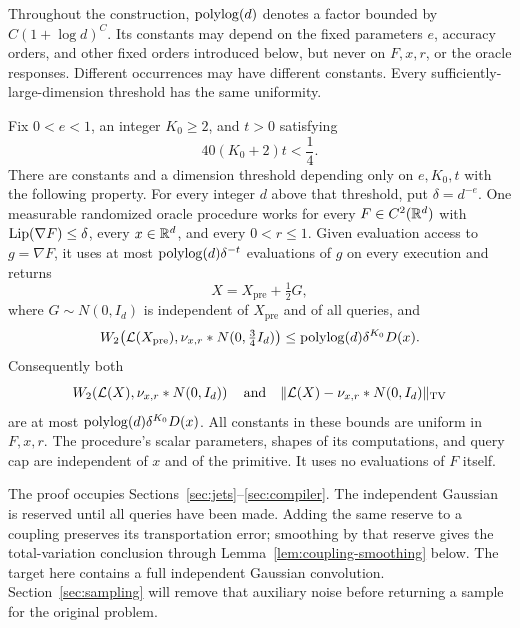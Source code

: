 Throughout the construction, \(\operatorname{polylog}(d)\) denotes a factor
bounded by \(C(1+\log d)^C\). Its constants may depend on the
fixed parameters \(e\), accuracy orders, and other fixed orders
introduced below, but never on \(F,x,r\), or the oracle responses.
Different occurrences may have different constants. Every
sufficiently-large-dimension threshold has the same uniformity.

\begin{theorem}\label{thm:primitive}
Fix \(0<e<1\), an integer \(K_0\ge2\), and \(t>0\) satisfying
\begin{equation}\label{eq:t-choice}
                 40(K_0+2)t<\frac14.
\end{equation}
There are constants and a dimension threshold depending only on
\(e,K_0,t\) with the following property. For every integer \(d\)
above that threshold, put \(\delta=d^{-e}\). One measurable randomized
oracle procedure works for every \(F\in C^2(\mathbb R^d)\) with
\(\operatorname{Lip}(\nabla F)\le\delta\), every \(x\in\mathbb R^d\), and every
\(0<r\le1\). Given evaluation access to \(g=\nabla F\), it
uses at most \(\operatorname{polylog}(d)\delta^{-t}\) evaluations of
\(g\) on every execution and returns
\[
                  X=X_{\mathrm{pre}}+\tfrac12G,
\]
where \(G\sim N(0,I_d)\) is independent of \(X_{\mathrm{pre}}\) and of all
queries, and
\begin{equation}\label{eq:primitive-pre-noise}
 W_2\!\left(\mathcal L(X_{\mathrm{pre}}),
       \nu_{x,r}*N(0,\tfrac34I_d)\right)
       \le \operatorname{polylog}(d)\delta^{K_0}D(x).
\end{equation}
Consequently both
\[
 W_2\!\left(\mathcal L(X),\nu_{x,r}*N(0,I_d)\right)
 \quad\hbox{and}\quad
 \lVert\mathcal L(X)-\nu_{x,r}*N(0,I_d)\rVert_{\mathrm{TV}}
\]
are at most \(\operatorname{polylog}(d)\delta^{K_0}D(x)\).
All constants in these bounds are uniform in \(F,x,r\).
The procedure's scalar parameters, shapes of its computations,
and query cap are independent of \(x\) and of the primitive.
It uses no evaluations of \(F\) itself.
\end{theorem}

The proof occupies Sections~\ref{sec:jets}--\ref{sec:compiler}.
The independent Gaussian is reserved until all queries have been made.
Adding the same reserve to a coupling preserves its transportation
error; smoothing by that reserve gives the total-variation conclusion
through Lemma~\ref{lem:coupling-smoothing} below. The target here
contains a full independent Gaussian convolution.
Section~\ref{sec:sampling} will remove that auxiliary noise before
returning a sample for the original problem.

